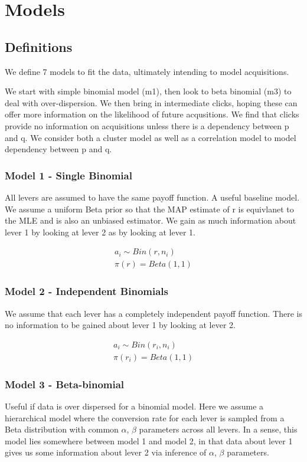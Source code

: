 \documentclass[11pt,a4,singlespacing,titlepagenumber=on]{scrreprt}
\numberwithin{equation}{chapter} %
\theoremstyle{remark}
\begin{document}
\chapter{Models}

\section{Definitions} 

We define 7 models to fit the data, ultimately intending to model acquisitions.

We start with simple binomial model (m1), then look to beta binomial (m3) to deal with over-dispersion. We then bring in intermediate clicks, hoping these can offer more information on the likelihood of future acqusitions. We find that clicks provide no information on acquisitions unless there is a dependency between p and q. We consider both a cluster model as well as a correlation model to model dependency between p and q.

\subsection{Model 1 - Single Binomial} 
All levers are assumed to have the same payoff function. A useful baseline model. We assume a uniform Beta prior so that the MAP estimate of r is equivlanet to the MLE and is also an unbiased estimator. We gain as much information about lever 1 by looking at lever 2 as by looking at lever 1.

  \begin{align}
	a_i \sim Bin(r,n_i) \\
	\pi(r) = Beta(1,1)
  \end{align}

\subsection{Model 2 - Independent Binomials} 
We assume that each lever has a completely independent payoff function. There is no information to be gained about lever 1 by looking at lever 2.

  \begin{align}
	a_i \sim Bin(r_i,n_i) \\
	\pi(r_i) = Beta(1,1)
  \end{align}

\subsection{Model 3 - Beta-binomial} 
Useful if data is over dispersed for a binomial model. Here we assume a hierarchical model where the conversion rate for each lever is sampled from a Beta distribution with common $\alpha$, $\beta$ parameters across all levers. In a sense, this model lies somewhere between model 1 and model 2, in that data about lever 1 gives us some information about lever 2 via inference of $\alpha$, $\beta$ parameters. 
\end{document}

